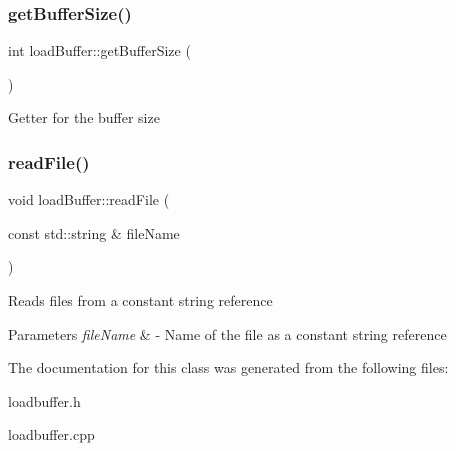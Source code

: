 \subsubsection{\texorpdfstring{get\+Buffer\+Size()}{getBufferSize()}}
{\footnotesize\ttfamily int load\+Buffer\+::get\+Buffer\+Size (\begin{DoxyParamCaption}{ }\end{DoxyParamCaption})}

Getter for the buffer size \mbox{\label{classloadBuffer_adfdc981dd37280f382467ecd6fb087c6}} 
\subsubsection{\texorpdfstring{read\+File()}{readFile()}}
{\footnotesize\ttfamily void load\+Buffer\+::read\+File (\begin{DoxyParamCaption}\item[{const std\+::string \&}]{file\+Name }\end{DoxyParamCaption})}

Reads files from a constant string reference 
\begin{DoxyParams}{Parameters}
{\em file\+Name} & -\/ Name of the file as a constant string reference \\
\hline
\end{DoxyParams}


The documentation for this class was generated from the following files\+:\begin{DoxyCompactItemize}
\item 
loadbuffer.\+h\item 
loadbuffer.\+cpp\end{DoxyCompactItemize}
